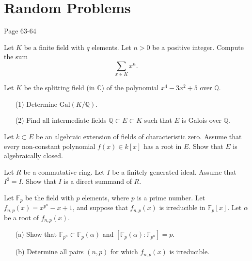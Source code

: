 \chapter{Random Problems}
Page 63-64

\begin{prob}[F2005-Q1]
    Let \(K\) be a finite field with \(q\) elements. Let \(n > 0\) be a positive integer. Compute the sum
    \[\sum_{x \in K} x^n.\]
\end{prob}


\begin{prob}[F2005-Q2]
    Let \(K\) be the splitting field (in \(\mathbb{C}\)) of the polynomial \(x^4 - 3x^2 + 5\) over \(\mathbb{Q}\).
    \begin{itemize}
        \item[(1)] Determine \(\text{Gal}(K/\mathbb{Q})\).
        \item[(2)] Find all intermediate fields \(\mathbb{Q} \subset E \subset K\) such that \(E\) is Galois over \(\mathbb{Q}\).
    \end{itemize}
\end{prob}

\begin{prob}[F2005-Q3]
    Let \(k \subset E\) be an algebraic extension of fields of characteristic zero. Assume that every non-constant polynomial \(f(x) \in k[x]\) has a root in \(E\). Show that \(E\) is algebraically closed.
\end{prob}

\begin{prob}[F2005-Q4]
    Let \(R\) be a commutative ring. Let \(I\) be a finitely generated ideal. Assume that \(I^2 = I\). Show that \(I\) is a direct summand of \(R\).
\end{prob}

\begin{prob}[S2005-Q2]
    Let \(\mathbb{F}_p\) be the field with \(p\) elements, where \(p\) is a prime number. Let \(f_{n,p}(x) = x^{p^n} - x + 1\), and suppose that \(f_{n,p}(x)\) is irreducible in \(\mathbb{F}_p[x]\). Let \(\alpha\) be a root of \(f_{n,p}(x)\).
    \begin{itemize}
        \item[(a)] Show that \(\mathbb{F}_{p^n} \subset \mathbb{F}_p(\alpha)\) and \([\mathbb{F}_p(\alpha) : \mathbb{F}_{p^n}] = p\).
        \item[(b)] Determine all pairs \((n, p)\) for which \(f_{n,p}(x)\) is irreducible.
    \end{itemize}
\end{prob}


